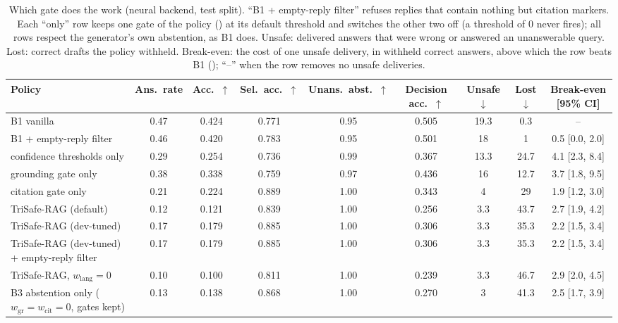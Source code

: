\begin{table}[t]
  \caption{Which gate does the work (neural backend, test split). ``B1 + empty-reply filter'' refuses replies that contain nothing but citation markers. Each ``only'' row keeps one gate of the policy (\PolicyRef) at its default threshold and switches the other two off (a threshold of 0 never fires); all rows respect the generator's own abstention, as B1 does. Unsafe: delivered answers that were wrong or answered an unanswerable query. Lost: correct drafts the policy withheld. Break-even: the cost of one unsafe delivery, in withheld correct answers, above which the row beats B1 (\CostRef); ``--'' when the row removes no unsafe deliveries.}
  \label{tab:gates-neural}
  \footnotesize
  \setlength{\tabcolsep}{4pt}
  \begin{tabular}{lcccccccc}
    \toprule
    Policy & Ans.\ rate & Acc.\ $\uparrow$ & Sel.\ acc.\ $\uparrow$ & Unans.\ abst.\ $\uparrow$ & Decision acc.\ $\uparrow$ & Unsafe $\downarrow$ & Lost $\downarrow$ & Break-even [95\% CI] \\
    \midrule
    B1 vanilla & 0.47 & 0.424 & 0.771 & 0.95 & 0.505 & 19.3 & 0.3 & -- \\
    B1 + empty-reply filter & 0.46 & 0.420 & 0.783 & 0.95 & 0.501 & 18 & 1 & 0.5 [0.0, 2.0] \\
    confidence thresholds only & 0.29 & 0.254 & 0.736 & 0.99 & 0.367 & 13.3 & 24.7 & 4.1 [2.3, 8.4] \\
    grounding gate only & 0.38 & 0.338 & 0.759 & 0.97 & 0.436 & 16 & 12.7 & 3.7 [1.8, 9.5] \\
    citation gate only & 0.21 & 0.224 & 0.889 & 1.00 & 0.343 & 4 & 29 & 1.9 [1.2, 3.0] \\
    TriSafe-RAG (default) & 0.12 & 0.121 & 0.839 & 1.00 & 0.256 & 3.3 & 43.7 & 2.7 [1.9, 4.2] \\
    TriSafe-RAG (dev-tuned) & 0.17 & 0.179 & 0.885 & 1.00 & 0.306 & 3.3 & 35.3 & 2.2 [1.5, 3.4] \\
    TriSafe-RAG (dev-tuned) + empty-reply filter & 0.17 & 0.179 & 0.885 & 1.00 & 0.306 & 3.3 & 35.3 & 2.2 [1.5, 3.4] \\
    TriSafe-RAG, $w_{\mathrm{lang}}=0$ & 0.10 & 0.100 & 0.811 & 1.00 & 0.239 & 3.3 & 46.7 & 2.9 [2.0, 4.5] \\
    B3 abstention only ($w_{\mathrm{gr}}{=}w_{\mathrm{cit}}{=}0$, gates kept) & 0.13 & 0.138 & 0.868 & 1.00 & 0.270 & 3 & 41.3 & 2.5 [1.7, 3.9] \\
    \bottomrule
  \end{tabular}
\end{table}
